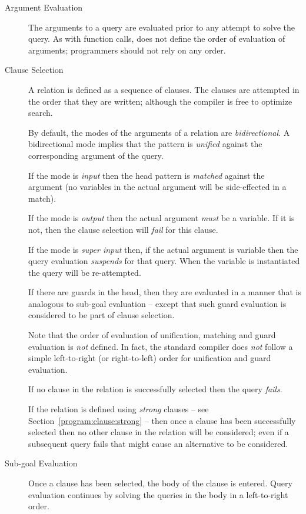 \begin{description}
\item[Argument Evaluation]
The arguments to a query are evaluated prior to any attempt to solve the query. As with function calls, \go does not define the order of evaluation of arguments; programmers should not rely on any order.
\item[Clause Selection]
A relation is defined as a sequence of clauses. The clauses are attempted in the order that they are written; although the compiler is free to optimize search.

By default, the modes of the arguments of a relation are \emph{bidirectional}. A bidirectional mode implies that the pattern is \emph{unified} against the corresponding argument of the query.

If the mode is \emph{input} then the head pattern is \emph{matched} against the argument (no variables in the actual argument will be side-effected in a match).

If the mode is \emph{output} then the actual argument \emph{must} be a variable. If it is not, then the clause selection will \emph{fail} for this clause.

If the mode is \emph{super input} then, if the actual argument is variable then the query evaluation \emph{suspends} for that query. When the variable is instantiated the query will be re-attempted.

If there are guards in the head, then they are evaluated in a manner that is analogous to sub-goal evaluation -- except that such guard evaluation is considered to be part of clause selection.

Note that the order of evaluation of unification, matching and guard evaluation is \emph{not} defined. In fact, the standard compiler does \emph{not} follow a simple left-to-right (or right-to-left) order for unification and guard evaluation.

If no clause in the relation is successfully selected then the query \emph{fails}.

If the relation is defined using \emph{strong} clauses -- see Section~\vref{program:clause:strong} -- then once a clause has been successfully selected then no other clause in the relation will be considered; even if a subsequent query fails that might cause an alternative to be considered.

\item[Sub-goal Evaluation]
Once a clause has been selected, the body of the clause is entered. Query evaluation continues by solving the queries in the body in a left-to-right order.


\end{description}
